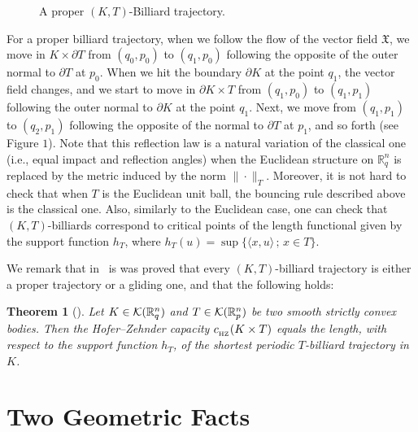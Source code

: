 \documentclass[11pt]{article}
\newtheorem{theorem}[lemma]{Theorem}
\begin{document}
{\begin{figure}
\begin{center}
 \caption{A proper $(K,T)$-Billiard trajectory.} 
 \end{center}
 \end{figure}


For a proper billiard trajectory, when we follow the flow of the vector field
${\mathfrak X}$, we move in $K \times \partial T$ from $(q_0,p_0)$ to
$(q_1,p_0)$ following the opposite of the outer normal to
$\partial T$ at $p_0$. When we hit the boundary $\partial K$ at the
point $q_1$, the vector field  changes, and we start to move in
$\partial K \times T$ from $(q_1,p_0)$ to $(q_1,p_1)$ following the outer
 normal to $\partial K$ at the point $q_1$.  Next, we move from
$(q_1,p_1)$ to $(q_2,p_1)$ following the opposite of the normal to
$\partial T$ at $p_1$, and so forth  (see
Figure $1$). Note that this reflection law is a
natural variation of the classical one (i.e., equal impact and
reflection angles) when the Euclidean structure on ${\mathbb R}^n_q$
is replaced by the metric induced by the norm $\| \cdot \|_{T}$.
Moreover, it is not hard to check that when $T$ is the Euclidean
unit ball, the bouncing rule described above is the
classical one. Also, similarly to the Euclidean case, one can check that  $(K,T)$-billiards 
correspond to critical points of   the length functional given by  the support function $h_T$, where $h_T(u) = \sup \{ \langle x,u \rangle \, ; \, x \in T \}$. 
%

We remark that in~\cite{AAO1} is was proved that 
every $(K,T)$-billiard trajectory is either a proper trajectory or a gliding one, and that the following holds:


\begin{theorem}[\cite{AAO1}] \label{Main-Theorem-From-AAO1}
Let $K \in {\cal K}({\mathbb R}_q^n)$ and $T \in {\cal K}({\mathbb R}_p^n)$ be
two smooth strictly convex bodies. Then the Hofer--Zehnder capacity $c_{_{\rm HZ}}(K \times T)$ equals the length, with respect to the support function $h_T$, of the shortest periodic $T$-billiard trajectory in $K$. 
\end{theorem}




\section{Two Geometric Facts}\label{sec:geometric facts}        %

}
\end{document}
